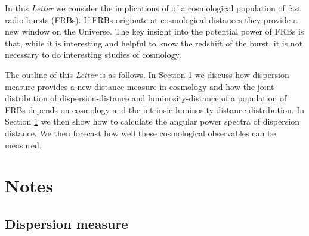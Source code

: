 \documentclass[onecolumn,prd,noshowpacs,nofootinbib,amsmath,amssymb]{revtex4}
\begin{document}
In this \emph{ Letter} we consider the implications of of a cosmological population of fast radio bursts (FRBs). 
 If FRBs originate at cosmological distances they provide a new window on the Universe. The key insight into the potential power of FRBs is that, while it is interesting and helpful to know the redshift of the burst, it is not necessary to do interesting studies of cosmology.
 
 The outline of this \emph{Letter} is as follows. In Section \ref{sec:notes} we discuss how dispersion measure provides a new distance measure in cosmology and how the joint distribution of dispersion-distance and luminosity-distance of a population of FRBs depends on cosmology and the intrinsic luminosity distance distribution.   In Section \ref{sec:notes} we then show how to calculate the angular power spectra of dispersion distance.  We then forecast how well these cosmological observables can be measured.

%
%

\section{Notes}\label{sec:notes}

\subsection{Dispersion measure}


\end{document}
